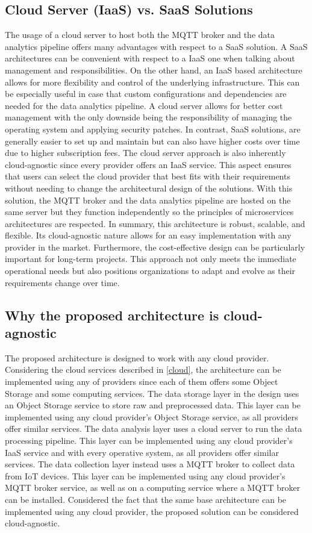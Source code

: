 \subsection{Cloud Server (IaaS) vs. SaaS Solutions}

The usage of a cloud server to host both the MQTT broker and the data analytics pipeline offers many advantages with respect to a SaaS solution.
A SaaS architectures can be convenient with respect to a IaaS one when talking about management and responsibilities. On the other hand, an IaaS based architecture allows for more flexibility and control of the underlying infrastructure. This can be especially useful in case that custom configurations and dependencies are needed for the data analytics pipeline.
A cloud server allows for better cost management with the only downside being the responsibility of managing the operating system and applying security patches. In contrast, SaaS solutions, are generally easier to set up and maintain but can also have higher costs over time due to higher subscription fees.
The cloud server approach is also inherently cloud-agnostic since every provider offers an IaaS service. This aspect ensures that users can select the cloud provider that best fits with their requirements without needing to change the architectural design of the solutions. With this solution, the MQTT broker and the data analytics pipeline are hosted on the same server but they function independently so the principles of microservices architectures are respected.
In summary, this architecture is robust, scalable, and flexible. Its cloud-agnostic nature allows for an easy implementation with any provider in the market. Furthermore, the cost-effective design can be particularly important for long-term projects. This approach not only meets the immediate operational needs but also positions organizations to adapt and evolve as their requirements change over time.

\subsection{Why the proposed architecture is cloud-agnostic}
The proposed architecture is designed to work with any cloud provider. Considering the cloud services described in \ref{cloud}, the architecture can be implemented using any of providers since each of them offers some Object Storage and some computing services. The data storage layer in the design uses an Object Storage service to store raw and preprocessed data. This layer can be implemented using any cloud provider's Object Storage service, as all providers offer similar services. The data analysis layer uses a cloud server to run the data processing pipeline. This layer can be implemented using any cloud provider's IaaS service and with every operative system, as all providers offer similar services. The data collection layer instead uses a MQTT broker to collect data from IoT devices. This layer can be implemented using any cloud provider's MQTT broker service, as well as on a computing service where a MQTT broker can be installed. Considered the fact that the same base architecture can be implemented using any cloud provider, the proposed solution can be considered cloud-agnostic.
